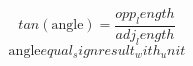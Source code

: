 \[tan(\text{{{angle}}})=\frac{{{opp_length}}}{{{adj_length}}}\]
\[\text{{{angle}}}{equal_sign}{result_with_unit}\]
